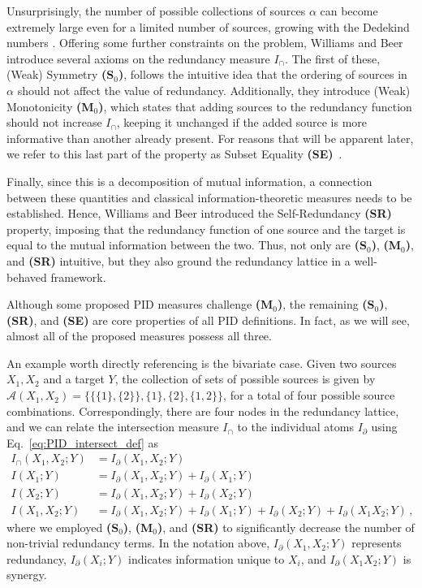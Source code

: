 \documentclass{article}
\newcommand{\ts}[1]{\ensuremath{_{\text{#1}}}}
\newcommand{\Ic}{\ensuremath{I_\cap}\xspace}
\newcommand{\Icap}{\ensuremath{I_\cap(X_1,X_2;Y)}}
\newcommand{\SR}{\textbf{(SR)}\xspace} %
\newcommand{\Sz}{\textbf{(S\ts{0})}\xspace} %
\newcommand{\Mz}{\textbf{(M\ts{0})}\xspace} %
\newcommand{\SE}{\textbf{(SE)}\xspace} %
\begin{document}
Unsurprisingly, the number of possible collections of sources $\alpha$ can become extremely large even for a limited number of sources, growing with the Dedekind numbers \cite{gutknecht2021bits}. Offering some further constraints on the problem, Williams and Beer introduce several axioms on the redundancy measure $I_\cap$. The first of these, (Weak) Symmetry \Sz, follows the intuitive idea that the ordering of sources in $\alpha$ should not affect the value of redundancy. Additionally, they introduce (Weak) Monotonicity \Mz, which states that adding sources to the redundancy function should not increase \Ic, keeping it unchanged if the added source is more informative than another already present. For reasons that will be apparent later, we refer to this last part of the property as Subset Equality \SE~\cite{ince2017measuring}. 

Finally, since this is a decomposition of mutual information, a connection between these quantities and classical information-theoretic measures needs to be established. Hence, Williams and Beer introduced the Self-Redundancy \SR property, imposing that the redundancy function of one source and the target is equal to the mutual information between the two.  Thus, not only are \Sz, \Mz, and \SR intuitive, but they also ground the redundancy lattice in a well-behaved framework.

Although some proposed PID measures challenge \Mz, the remaining \Sz, \SR, and \SE are core properties of all PID definitions. In fact, as we will see, almost all of the proposed measures possess all three.

An example worth directly referencing is the bivariate case. Given two sources $X_1,X_2$ and a target $Y$, the collection of sets of possible sources is given by $\mathcal{A}(X_1,X_2)=\{\{\{1\},\{2\}\},\{1\},\{2\},\{1,2\}\}$, for a total of four possible source combinations. Correspondingly, there are four nodes in the redundancy lattice, and we can relate the intersection measure $\Ic$ to the individual atoms $I_\partial$ using Eq.~\ref{eq:PID_intersect_def} as
\begin{align} \label{eq:PID2_1}
    \Icap & = I_\partial(X_1,X_2;Y) \\
    I(X_1;Y) & = I_\partial(X_1,X_2;Y) + I_\partial(X_1;Y) \\
    I(X_2;Y) & = I_\partial(X_1,X_2;Y) + I_\partial(X_2;Y) \\
    I(X_1,X_2;Y) & = I_\partial(X_1,X_2;Y)+I_\partial(X_1;Y)+I_\partial(X_2;Y)+I_\partial(X_1X_2;Y) \,, \label{eq:PID2_4}
\end{align}
where we employed \Sz, \Mz, and \SR to significantly decrease the number of non-trivial redundancy terms.
In the notation above, $I_\partial(X_1,X_2;Y)$ represents redundancy, $I_\partial(X_i;Y)$ indicates information unique to $X_i$, and $I_\partial(X_1X_2;Y)$ is synergy.
\end{document}
